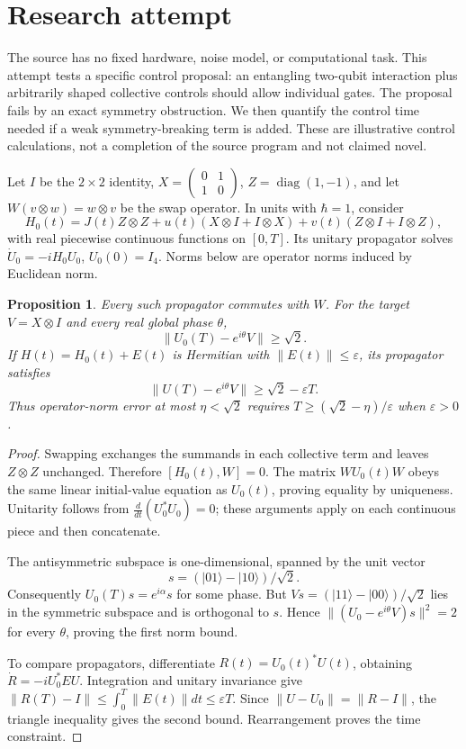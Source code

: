 \documentclass[11pt]{article}
\newtheorem{proposition}{Proposition}
\begin{document}
\section{Research attempt}
The source has no fixed hardware, noise model, or computational task. This attempt tests a specific control proposal: an entangling two-qubit interaction plus arbitrarily shaped collective controls should allow individual gates. The proposal fails by an exact symmetry obstruction. We then quantify the control time needed if a weak symmetry-breaking term is added. These are illustrative control calculations, not a completion of the source program and not claimed novel.

Let $I$ be the $2\times2$ identity, $X=\left(\begin{smallmatrix}0&1\\1&0\end{smallmatrix}\right)$, $Z=\operatorname{diag}(1,-1)$, and let $W(v\otimes w)=w\otimes v$ be the swap operator. In units with $\hbar=1$, consider
\[
 H_0(t)=J(t)Z\otimes Z+u(t)(X\otimes I+I\otimes X)
             +v(t)(Z\otimes I+I\otimes Z),
\]
with real piecewise continuous functions on $[0,T]$. Its unitary propagator solves $\dot U_0=-iH_0U_0$, $U_0(0)=I_4$. Norms below are operator norms induced by Euclidean norm.

\begin{proposition}
Every such propagator commutes with $W$. For the target $V=X\otimes I$ and every real global phase $\theta$,
\[
 \|U_0(T)-e^{i\theta}V\|\ge\sqrt2.
\]
If $H(t)=H_0(t)+E(t)$ is Hermitian with $\|E(t)\|\le\varepsilon$, its propagator satisfies
\[
 \|U(T)-e^{i\theta}V\|\ge\sqrt2-\varepsilon T.
\]
Thus operator-norm error at most $\eta<\sqrt2$ requires $T\ge(\sqrt2-\eta)/\varepsilon$ when $\varepsilon>0$.
\end{proposition}
\begin{proof}
Swapping exchanges the summands in each collective term and leaves $Z\otimes Z$ unchanged. Therefore $[H_0(t),W]=0$. The matrix $WU_0(t)W$ obeys the same linear initial-value equation as $U_0(t)$, proving equality by uniqueness. Unitarity follows from $\frac d{dt}(U_0^*U_0)=0$; these arguments apply on each continuous piece and then concatenate.

The antisymmetric subspace is one-dimensional, spanned by the unit vector
\[
 s=(|01\rangle-|10\rangle)/\sqrt2.
\]
Consequently $U_0(T)s=e^{i\alpha}s$ for some phase. But $Vs=(|11\rangle-|00\rangle)/\sqrt2$ lies in the symmetric subspace and is orthogonal to $s$. Hence $\|(U_0-e^{i\theta}V)s\|^2=2$ for every $\theta$, proving the first norm bound.

To compare propagators, differentiate $R(t)=U_0(t)^*U(t)$, obtaining $\dot R=-iU_0^*EU$. Integration and unitary invariance give $\|R(T)-I\|\le\int_0^T\|E(t)\|dt\le\varepsilon T$. Since $\|U-U_0\|=\|R-I\|$, the triangle inequality gives the second bound. Rearrangement proves the time constraint.
\end{proof}
\end{document}

